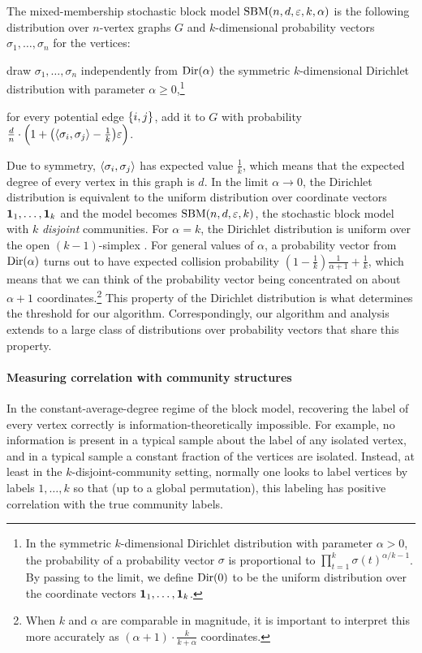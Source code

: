 \begin{definition}
  \label{def:mixed-membership-sbm}
The mixed-membership stochastic block model $\mathrm{SBM}(n,d,\varepsilon,k,\alpha)$  is the following distribution over $n$-vertex graphs $G$ and $k$-dimensional probability vectors $\sigma_1,\ldots,\sigma_n$ for the vertices:
\begin{compactitem}
\item draw $\sigma_1,\ldots,\sigma_n$ independently from $\mathrm{Dir}(\alpha)$ the symmetric $k$-dimensional Dirichlet distribution with parameter $\alpha\ge 0$,\footnote{In the symmetric $k$-dimensional Dirichlet distribution with parameter $\alpha> 0$, the probability of a probability vector $\sigma$ is proportional to $\prod_{t=1}^k \sigma(t)^{\alpha/k - 1 }$. By passing to the limit, we define $\mathrm{Dir}(0)$ to be the uniform distribution over the coordinate vectors $\operatorname{\mathbf 1}_1,\ldots,\operatorname{\mathbf 1}_k$.}
\item for every potential edge $\{i,j\}$, add it to $G$ with probability $\tfrac d n \cdot \Big(1 + \big(\langle\sigma_i,\sigma_j\rangle-\tfrac 1k\big)\varepsilon \Big)$.
\end{compactitem}
\end{definition}
Due to symmetry, $\langle\sigma_i,\sigma_j\rangle$ has expected value $\tfrac 1k$, which means that the expected degree of every vertex in this graph is $d$.
In the limit $\alpha \to 0$, the Dirichlet distribution is equivalent to the uniform distribution over coordinate vectors $\operatorname{\mathbf 1}_1,\ldots,\operatorname{\mathbf 1}_k$ and the model becomes $\mathrm{SBM}(n,d,\varepsilon,k)$, the stochastic block model with $k$ \emph{disjoint} communities.
For $\alpha=k$, the Dirichlet distribution is uniform over the open $(k-1)$-simplex \cite{wiki:Dirichlet_distribution}.
For general values of $\alpha$, a probability vector from $\mathrm{Dir}(\alpha)$ turns out to have expected collision probability $(1-\tfrac 1k)\tfrac {1}{\alpha+1} + \tfrac 1 k$, which means that  we can think of the probability vector being concentrated on about $\alpha+1$ coordinates.\footnote{When $k$ and $\alpha$ are comparable in magnitude, it is important to interpret this more accurately as $(\alpha + 1) \cdot \tfrac k {k+\alpha}$ coordinates.}
This property of the Dirichlet distribution is what determines the threshold for our algorithm.
Correspondingly, our algorithm and analysis extends to a large class of distributions over probability vectors that share this property.

\paragraph{Measuring correlation with community structures}
In the constant-average-degree regime of the block model, recovering the label of every vertex correctly is information-theoretically impossible.
For example, no information is present in a typical sample about the label of any isolated vertex, and in a typical sample a constant fraction of the vertices are isolated.
Instead, at least in the $k$-disjoint-community setting, normally one looks to label vertices by labels $1,\ldots,k$ so that (up to a global permutation), this labeling has positive correlation with the true community labels.

